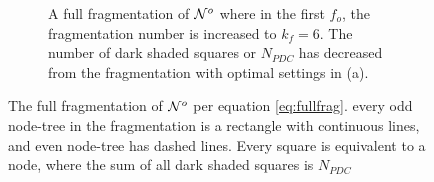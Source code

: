 \begin{figure}[htbp]
\begin{subfigure}[b]{\textwidth}
    \caption{A full fragmentation of $\mathcal{N}^o$ where in the first $f_o$, the fragmentation number is increased to $k_f = 6$. The number of dark shaded squares or $N_{PDC}$ has decreased from the fragmentation with optimal settings in (a). }\label{fig:fragfnumber}
  \end{subfigure}
  \caption{The full fragmentation of $\mathcal{N}^o$ per equation \eqref{eq:fullfrag}. every odd node-tree in the fragmentation is a rectangle with continuous lines, and even node-tree has dashed lines. Every square is equivalent to a node, where the sum of all dark shaded squares is $N_{PDC}$}\label{fig:fragexamples}
\end{figure}